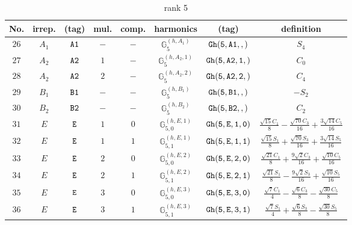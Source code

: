 \documentclass[fleqn,8pt]{jsarticle}
\begin{document}
\begin{table}[ht!]
\begin{center}
\caption{rank 5}
\renewcommand{\arraystretch}{1.3}
\begin{tabular}{cccccccc} \hline \hline
No. & irrep. & (tag) & mul. & comp. & harmonics & (tag) & definition \\ \hline
$ 26 $ & $ A_{1} $ & $ {\tt A1} $ & $ - $ & $ - $ & $ \mathbb{G}_{5}^{(h,A_{1})} $ & $ {\tt Gh(5,A1,,)} $ & $ S_{4} $ \\
$ 27 $ & $ A_{2} $ & $ {\tt A2} $ & $ 1 $ & $ - $ & $ \mathbb{G}_{5}^{(h,A_{2},1)} $ & $ {\tt Gh(5,A2,1,)} $ & $ C_{0} $ \\
$ 28 $ & $ A_{2} $ & $ {\tt A2} $ & $ 2 $ & $ - $ & $ \mathbb{G}_{5}^{(h,A_{2},2)} $ & $ {\tt Gh(5,A2,2,)} $ & $ C_{4} $ \\
$ 29 $ & $ B_{1} $ & $ {\tt B1} $ & $ - $ & $ - $ & $ \mathbb{G}_{5}^{(h,B_{1})} $ & $ {\tt Gh(5,B1,,)} $ & $ - S_{2} $ \\
$ 30 $ & $ B_{2} $ & $ {\tt B2} $ & $ - $ & $ - $ & $ \mathbb{G}_{5}^{(h,B_{2})} $ & $ {\tt Gh(5,B2,,)} $ & $ C_{2} $ \\
$ 31 $ & $ E $ & $ {\tt E} $ & $ 1 $ & $ 0 $ & $ \mathbb{G}_{5,0}^{(h,E,1)} $ & $ {\tt Gh(5,E,1,0)} $ & $ \frac{\sqrt{15} C_{1}}{8} - \frac{\sqrt{70} C_{3}}{16} + \frac{3 \sqrt{14} C_{5}}{16} $ \\
$ 32 $ & $ E $ & $ {\tt E} $ & $ 1 $ & $ 1 $ & $ \mathbb{G}_{5,1}^{(h,E,1)} $ & $ {\tt Gh(5,E,1,1)} $ & $ \frac{\sqrt{15} S_{1}}{8} + \frac{\sqrt{70} S_{3}}{16} + \frac{3 \sqrt{14} S_{5}}{16} $ \\
$ 33 $ & $ E $ & $ {\tt E} $ & $ 2 $ & $ 0 $ & $ \mathbb{G}_{5,0}^{(h,E,2)} $ & $ {\tt Gh(5,E,2,0)} $ & $ \frac{\sqrt{21} C_{1}}{8} + \frac{9 \sqrt{2} C_{3}}{16} + \frac{\sqrt{10} C_{5}}{16} $ \\
$ 34 $ & $ E $ & $ {\tt E} $ & $ 2 $ & $ 1 $ & $ \mathbb{G}_{5,1}^{(h,E,2)} $ & $ {\tt Gh(5,E,2,1)} $ & $ \frac{\sqrt{21} S_{1}}{8} - \frac{9 \sqrt{2} S_{3}}{16} + \frac{\sqrt{10} S_{5}}{16} $ \\
$ 35 $ & $ E $ & $ {\tt E} $ & $ 3 $ & $ 0 $ & $ \mathbb{G}_{5,0}^{(h,E,3)} $ & $ {\tt Gh(5,E,3,0)} $ & $ \frac{\sqrt{7} C_{1}}{4} - \frac{\sqrt{6} C_{3}}{8} - \frac{\sqrt{30} C_{5}}{8} $ \\
$ 36 $ & $ E $ & $ {\tt E} $ & $ 3 $ & $ 1 $ & $ \mathbb{G}_{5,1}^{(h,E,3)} $ & $ {\tt Gh(5,E,3,1)} $ & $ \frac{\sqrt{7} S_{1}}{4} + \frac{\sqrt{6} S_{3}}{8} - \frac{\sqrt{30} S_{5}}{8} $ \\
 \hline \hline
\end{tabular}
\end{center}
\end{table}
\end{document}

